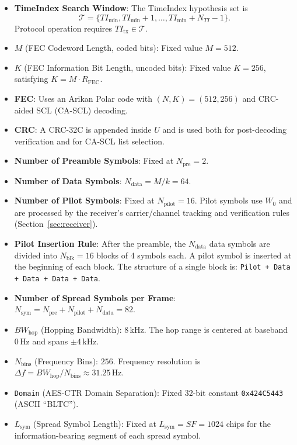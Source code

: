 \documentclass[11pt]{article}
\begin{document}
\begin{itemize}
  A TimeIndex $\mathit{TI}$ represents the half-open time interval
  $[\mathit{TI}\cdot\mathit{IV}_{\text{res}},(\mathit{TI}+1)\cdot\mathit{IV}_{\text{res}})$.
\item \textbf{TimeIndex Search Window}: The TimeIndex hypothesis set is
  \[
    \mathcal{T}=\{\mathit{TI}_{\min},\mathit{TI}_{\min}+1,\dots,\mathit{TI}_{\min}+N_{\mathit{TI}}-1\}.
  \]
  Protocol operation requires $\mathit{TI}_{\text{tx}}\in\mathcal{T}$.
\item $M$ (FEC Codeword Length, coded bits): Fixed value $M=512$.
\item $K$ (FEC Information Bit Length, uncoded bits): Fixed value $K=256$, satisfying $K=M\cdot R_{\text{FEC}}$.
\item \textbf{FEC}: Uses an Arikan Polar code with $(N,K)=(512,256)$ and CRC-aided SCL (CA-SCL) decoding.
\item \textbf{CRC}: A CRC-32C is appended inside $U$ and is used both for post-decoding verification and for CA-SCL list selection.
\item \textbf{Number of Preamble Symbols}: Fixed at $N_{\text{pre}}=2$.
\item \textbf{Number of Data Symbols}: $N_{\text{data}}=M/k=64$.
\item \textbf{Number of Pilot Symbols}: Fixed at $N_{\text{pilot}}=16$. Pilot symbols use $W_0$ and are processed by the receiver's carrier/channel tracking and verification rules (Section~\ref{sec:receiver}).
\item \textbf{Pilot Insertion Rule}: After the preamble, the $N_{\text{data}}$ data symbols are divided into $N_{\text{blk}}=16$ blocks of 4 symbols each. A pilot symbol is inserted at the beginning of each block. The structure of a single block is: \texttt{Pilot + Data + Data + Data + Data}.
\item \textbf{Number of Spread Symbols per Frame}: $N_{\text{sym}}=N_{\text{pre}}+N_{\text{pilot}}+N_{\text{data}}=82$.
\item $BW_{\text{hop}}$ (Hopping Bandwidth): $8\,\text{kHz}$. The hop range is centered at baseband $0\,\text{Hz}$ and spans $\pm 4\,\text{kHz}$.
\item $N_{\text{bins}}$ (Frequency Bins): $256$. Frequency resolution is $\Delta f = BW_{\text{hop}}/N_{\text{bins}} \approx 31.25\,\text{Hz}$.
\item \texttt{Domain} (AES-CTR Domain Separation): Fixed 32-bit constant \texttt{0x424C5443} (ASCII ``BLTC'').
\item $L_{\text{sym}}$ (Spread Symbol Length): Fixed at $L_{\text{sym}}=\mathit{SF}=1024$ chips for the information-bearing segment of each spread symbol.

\end{itemize}
\end{document}
